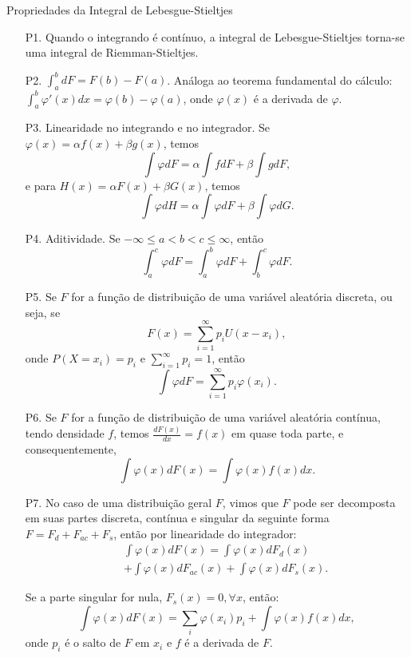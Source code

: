 %
\begin{frame}{Propriedades da Integral de Lebesgue-Stieltjes}
\vspace{-0.2cm}
	\begin{enumerate}
\item[P1.] Quando o integrando é contínuo, a integral de Lebesgue-Stieltjes torna-se uma integral de Riemman-Stieltjes.

\item[P2.] $\int_{a}^{b} dF=F(b)-F(a)$. Análoga ao teorema fundamental do cálculo: $\int_{a}^{b}\varphi'(x)dx=\varphi(b)-\varphi(a)$, onde $\varphi(x)$ é a derivada de $\varphi$.

\item[P3.] Linearidade no integrando e no integrador. Se $\varphi(x)=\alpha f(x)+\beta g(x)$, temos
$$\int \varphi dF=\alpha\int fdF+\beta\int gdF,$$
e para $H(x)=\alpha F(x)+\beta G(x)$, temos
$$\int \varphi dH=\alpha\int \varphi dF+\beta\int \varphi dG.$$

\item[P4.] Aditividade. Se $-\infty\leq a<b<c\leq\infty$, então
$$\int_{a}^{c} \varphi dF=\int_{a}^{b} \varphi dF+\int_{b}^{c} \varphi dF.$$

\item[P5.] Se $F$ for a função de distribuição de uma variável aleatória discreta, ou seja, se
$$F(x)=\sum_{i=1}^{\infty}p_iU(x-x_i),$$
onde $P(X=x_i)=p_i$ e $\sum_{i=1}^{\infty}p_i=1$, então
$$\int \varphi dF=\sum_{i=1}^{\infty}p_i\varphi(x_i).$$
%
\end{enumerate}
%
\end{frame}
%
\begin{frame}
%
\begin{enumerate}


\item[P6.] Se $F$ for a função de distribuição de uma variável aleatória contínua, tendo densidade $f$, temos $\frac{dF(x)}{dx}=f(x)$ em quase toda parte, e consequentemente,
$$\int \varphi(x) dF(x)=\int \varphi(x)f(x)dx.$$

\item[P7.] No caso de uma distribuição geral $F$, vimos que $F$ pode ser decomposta em suas partes discreta, contínua e singular da seguinte forma $F=F_d+F_{ac}+F_s$, então por linearidade do integrador:
\begin{eqnarray}
& & \int \varphi(x) dF(x)=\int \varphi(x) dF_d(x)
\nonumber \\
& & +\int \varphi(x) dF_{ac}(x)+\int \varphi(x) dF_s(x).\nonumber
\end{eqnarray}

Se a parte singular for nula, $F_s(x)=0, \forall x$, então:
$$\int \varphi(x) dF(x)=\sum_i \varphi(x_i) p_i+\int \varphi(x)f(x)dx,$$
onde $p_i$ é o salto de $F$ em $x_i$ e $f$ é a derivada de $F$.

\end{enumerate}
%
\end{frame}
